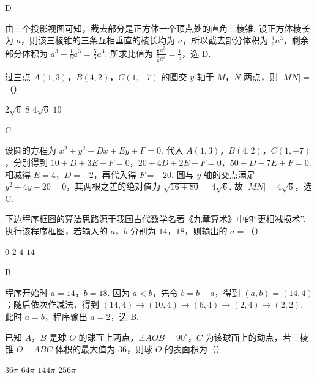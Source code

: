 \begin{answer}
D
\end{answer}

\begin{solution}
由三个投影视图可知，截去部分是正方体一个顶点处的直角三棱锥. 设正方体棱长为 \(a\)，则该三棱锥的三条互相垂直的棱长均为 \(a\)，所以截去部分体积为 \(\frac{1}{6}a^3\)，剩余部分体积为 \(a^3-\frac{1}{6}a^3=\frac{5}{6}a^3\). 所求比值为 \(\frac{\frac16a^3}{\frac56a^3}=\frac15\)，选 D.
\end{solution}

\begin{problem}
过三点 \(A(1,3)\)，\(B(4,2)\)，\(C(1,-7)\) 的圆交 \(y\) 轴于 \(M\)，\(N\) 两点，则 \(|MN|=\)（\quad）

\choices
    {\(2\sqrt{6}\)}
    {\(8\)}
    {\(4\sqrt{6}\)}
    {\(10\)}
\end{problem}

\begin{answer}
C
\end{answer}

\begin{solution}
设圆的方程为 \(x^2+y^2+Dx+Ey+F=0\). 代入 \(A(1,3)\)，\(B(4,2)\)，\(C(1,-7)\)，分别得到
\(10+D+3E+F=0\)，\(20+4D+2E+F=0\)，\(50+D-7E+F=0\).
相减得 \(E=4\)，\(D=-2\)，再代入得 \(F=-20\). 圆与 \(y\) 轴的交点满足 \(y^2+4y-20=0\)，其两根之差的绝对值为 \(\sqrt{16+80}=4\sqrt6\). 故 \(|MN|=4\sqrt6\)，选 C.
\end{solution}

\begin{problem}
下边程序框图的算法思路源于我国古代数学名著《九章算术》中的“更相减损术”. 执行该程序框图，若输入的 \(a\)，\(b\) 分别为 \(14\)，\(18\)，则输出的 \(a=\)（\quad）


\choices
    {\(0\)}
    {\(2\)}
    {\(4\)}
    {\(14\)}
\end{problem}

\begin{answer}
B
\end{answer}

\begin{solution}
程序开始时 \(a=14\)，\(b=18\). 因为 \(a<b\)，先令 \(b=b-a\)，得到 \((a,b)=(14,4)\)；随后依次作减法，得到
\((14,4)\to(10,4)\to(6,4)\to(2,4)\to(2,2)\).
此时 \(a=b\)，程序输出 \(a=2\)，选 B.
\end{solution}

\begin{problem}
已知 \(A\)，\(B\) 是球 \(O\) 的球面上两点，\(\angle AOB=90^\circ\)，\(C\) 为该球面上的动点，若三棱锥 \(O-ABC\) 体积的最大值为 \(36\)，则球 \(O\) 的表面积为（\quad）

\choices
    {\(36\pi\)}
    {\(64\pi\)}
    {\(144\pi\)}
    {\(256\pi\)}
\end{problem}

